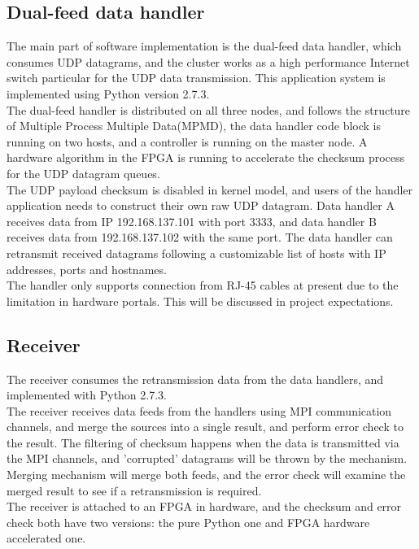 \documentclass[11pt,openright,a4paper]{report}
\begin{document}
\subsection{Dual-feed data handler}
The main part of software implementation is the dual-feed data handler, which consumes UDP datagrams, and the cluster works as a high performance Internet switch particular for the UDP data transmission. This application system is implemented using Python version 2.7.3.\\
The dual-feed handler is distributed on all three nodes, and follows the structure of Multiple Process Multiple Data(MPMD), the data handler code block is  running on two hosts, and a controller is running on the master node. A hardware algorithm in the FPGA is running to accelerate the checksum process for the UDP datagram queues.\\
The UDP payload checksum is disabled in kernel model, and users of the handler application needs to construct their own raw UDP datagram. Data handler A receives data from IP 192.168.137.101 with port 3333, and data handler B receives data from 192.168.137.102 with the same port. The data handler can retransmit received datagrams following a customizable list of hosts with IP addresses, ports and hostnames.\\
The handler only supports connection from RJ-45 cables at present due to the limitation in hardware portals. This will be discussed in project expectations.\\
\subsection{Receiver}
The receiver consumes the retransmission data from the data handlers, and implemented with Python 2.7.3.\\
The receiver receives data feeds from the handlers using MPI communication channels, and merge the sources into a single result, and perform error check to the result. The filtering of checksum happens when the data is transmitted via the MPI channels, and 'corrupted' datagrams will be thrown by the mechanism. Merging mechanism will merge both feeds, and the error check will examine the merged result to see if a retransmission is required.\\
The receiver is attached to an FPGA in hardware, and the checksum and error check both have two versions: the pure Python one and FPGA hardware accelerated one.\\
\end{document}

